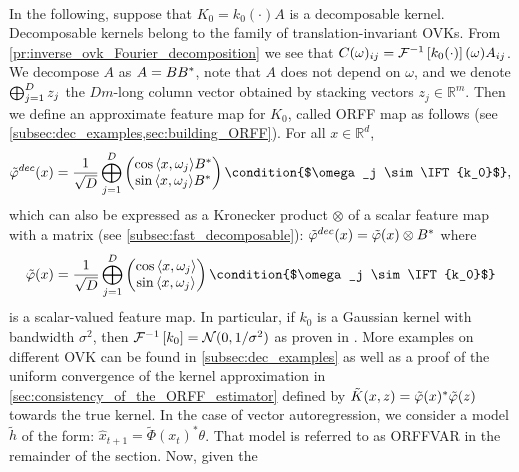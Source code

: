 \paragraph{}
In the following, suppose that $K_0=k_0(\cdot) A$ is a decomposable kernel.
Decomposable kernels belong to the family of translation-invariant \acsp{OVK}.
From \cref{pr:inverse_ovk_Fourier_decomposition} we see that
$C(\omega)_{ij}=\mathcal{F}^{-1}\left[k_0(\cdot)\right](\omega)A_{ij}$. We decompose $A$ as
$A=BB^*$, note that $A$ does not depend on $\omega$, and we denote
$\operatorname*{\bigoplus}_{j=1}^D z_j$ the $Dm$-long column vector obtained by stacking vectors
$z_j \in \mathbb{R}^m$. Then we define an approximate feature map for $K_0$,
called \acf{ORFF} map \citep{brault2016scaling} as follows (see
\cref{subsec:dec_examples,sec:building_ORFF}). For all $x\in\mathbb{R}^d$,
\begin{dmath*}
    \tilde{\Phi}^{dec}(x) = \frac{1}{\sqrt{D}}\Vect_{j=1}^D
    \begin{pmatrix}
        \cos{\inner{x,\omega_j}}B^\adjoint \\
        \sin{\inner{x,\omega_j}}B^\adjoint
    \end{pmatrix} \condition{$\omega_j \sim \IFT{k_0}$},
    \label{eq:generation}
\end{dmath*}
which can also be expressed as a Kronecker product $\otimes$ of a scalar
feature map with a matrix (see \cref{subsec:fast_decomposable}):
$\tilde{\Phi}^{dec}(x) = \tilde{\phi}(x)\otimes B^\adjoint$ where
\begin{dmath*}
    \tilde{\phi}(x) = \frac{1}{\sqrt{D}}\Vect_{j=1}^D
    \begin{pmatrix}
        \cos{\inner{x,\omega_j}} \\
        \sin{\inner{x,\omega_j}}
    \end{pmatrix}\condition{$\omega_j \sim \IFT{k_0}$}
\end{dmath*}
is a scalar-valued feature map. In particular, if $k_0$ is a Gaussian kernel
with bandwidth $\sigma^2$, then $\mathcal{F}^{-1}\left[k_0\right]=\mathcal{N}(0, 1/\sigma^2)$ as
proven in \citet{Rahimi2007}. More examples on different OVK can be found in
\cref{subsec:dec_examples} as well as a proof of the uniform convergence of the
kernel approximation in \cref{sec:consistency_of_the_ORFF_estimator} defined by
$\tilde{K}(x,z)=\tilde{\Phi}(x)^\adjoint\tilde{\Phi}(z)$ towards the true
kernel. In the case of vector autoregression, we consider a model $\tilde{h}$
of the form: $\hat{x}_{t+1}=\tilde{\Phi}(x_t)^*\theta$. That model is referred
to as \ac{ORFFVAR} in the remainder of the section. Now, given the
